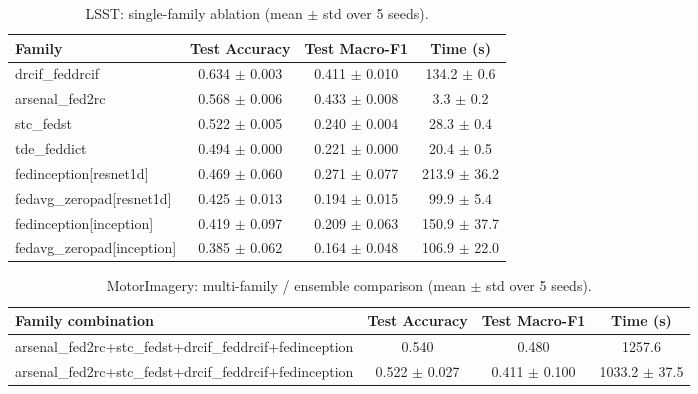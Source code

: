 \begin{table}[t]
\centering
\caption{LSST: single-family ablation (mean $\pm$ std over 5 seeds).}
\label{tab:results_lsst_ablation}
\begin{tabular}{lccc}
\toprule
Family & Test Accuracy & Test Macro-F1 & Time (s) \\
\midrule
drcif\_feddrcif & 0.634 $\pm$ 0.003 & 0.411 $\pm$ 0.010 & 134.2 $\pm$ 0.6 \\
arsenal\_fed2rc & 0.568 $\pm$ 0.006 & 0.433 $\pm$ 0.008 & 3.3 $\pm$ 0.2 \\
stc\_fedst & 0.522 $\pm$ 0.005 & 0.240 $\pm$ 0.004 & 28.3 $\pm$ 0.4 \\
tde\_feddict & 0.494 $\pm$ 0.000 & 0.221 $\pm$ 0.000 & 20.4 $\pm$ 0.5 \\
fedinception[resnet1d] & 0.469 $\pm$ 0.060 & 0.271 $\pm$ 0.077 & 213.9 $\pm$ 36.2 \\
fedavg\_zeropad[resnet1d] & 0.425 $\pm$ 0.013 & 0.194 $\pm$ 0.015 & 99.9 $\pm$ 5.4 \\
fedinception[inception] & 0.419 $\pm$ 0.097 & 0.209 $\pm$ 0.063 & 150.9 $\pm$ 37.7 \\
fedavg\_zeropad[inception] & 0.385 $\pm$ 0.062 & 0.164 $\pm$ 0.048 & 106.9 $\pm$ 22.0 \\
\bottomrule
\end{tabular}
\end{table}

\begin{table}[t]
\centering
\caption{MotorImagery: multi-family / ensemble comparison (mean $\pm$ std over 5 seeds).}
\label{tab:results_motorimagery_ensemble}
\begin{tabular}{lccc}
\toprule
Family combination & Test Accuracy & Test Macro-F1 & Time (s) \\
\midrule
arsenal\_fed2rc+stc\_fedst+drcif\_feddrcif+fedinception & 0.540 & 0.480 & 1257.6 \\
arsenal\_fed2rc+stc\_fedst+drcif\_feddrcif+fedinception & 0.522 $\pm$ 0.027 & 0.411 $\pm$ 0.100 & 1033.2 $\pm$ 37.5 \\
\bottomrule
\end{tabular}
\end{table}

